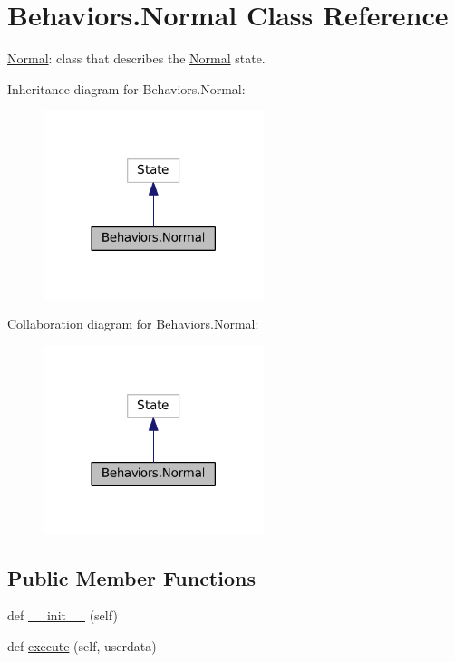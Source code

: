 \hypertarget{classBehaviors_1_1Normal}{}\section{Behaviors.\+Normal Class Reference}
\label{classBehaviors_1_1Normal}


\hyperlink{classBehaviors_1_1Normal}{Normal}\+: class that describes the \hyperlink{classBehaviors_1_1Normal}{Normal} state.  




Inheritance diagram for Behaviors.\+Normal\+:\nopagebreak
\begin{figure}[H]
\begin{center}
\leavevmode
\includegraphics[width=182pt]{classBehaviors_1_1Normal__inherit__graph}
\end{center}
\end{figure}


Collaboration diagram for Behaviors.\+Normal\+:\nopagebreak
\begin{figure}[H]
\begin{center}
\leavevmode
\includegraphics[width=182pt]{classBehaviors_1_1Normal__coll__graph}
\end{center}
\end{figure}
\subsection*{Public Member Functions}
\begin{DoxyCompactItemize}
\item 
def \hyperlink{classBehaviors_1_1Normal_a0d48c743470e9356c7eec875add25d1d}{\+\_\+\+\_\+init\+\_\+\+\_\+} (self)
\item 
def \hyperlink{classBehaviors_1_1Normal_ad85b58cb3f66b79ca64036abf251d191}{execute} (self, userdata)
\end{DoxyCompactItemize}



